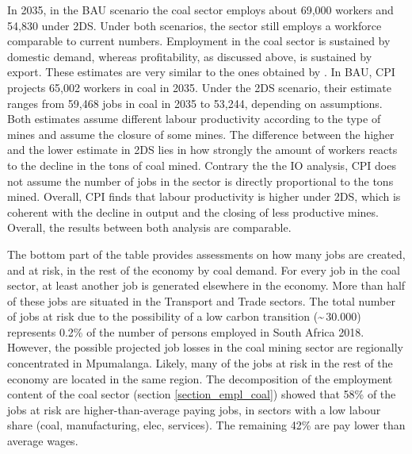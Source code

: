 \documentclass[12pt,english]{article}
\begin{document}
In 2035, in the BAU scenario the coal sector employs about 69,000 workers and 54,830 under 2DS. Under both scenarios, the sector still employs a workforce comparable to current numbers. Employment in the coal sector is sustained by domestic demand, whereas profitability, as discussed above, is sustained by export. These estimates are very similar to the ones obtained by \citep{CPI2019SA}. In BAU, CPI projects 65,002 workers in coal in 2035. Under the 2DS scenario, their estimate ranges from 59,468 jobs in coal in 2035 to 53,244, depending on assumptions. Both estimates assume different labour productivity according to the type of mines and assume the closure of some mines. The difference between the higher and the lower estimate in 2DS lies in how strongly the amount of workers reacts to the decline in the tons of coal mined. Contrary the the IO analysis, CPI does not assume the number of jobs in the sector is directly proportional to the tons mined. Overall, CPI finds that labour productivity is higher under 2DS, which is coherent with the decline in output and the closing of less productive mines. Overall, the results between both analysis are comparable. 

 
The bottom part of the table provides assessments on how many jobs are created, and at risk, in the rest of the economy by coal demand. For every job in the coal sector, at least another job is generated elsewhere in the economy. More than half of these jobs are situated in the Transport and Trade sectors. The total number of jobs at risk due to the possibility of a low carbon transition (\textasciitilde \,30.000) represents 0.2\% of the number of persons employed in South Africa 2018. However, the possible projected job losses in the coal mining sector are regionally concentrated in Mpumalanga. Likely, many of the jobs at risk in the rest of the economy are located in the same region.
The decomposition of the employment content of the coal sector (section \ref{section_empl_coal}) showed that 58\% of the jobs at risk are higher-than-average paying jobs, in sectors with a low labour share (coal, manufacturing, elec, services). The remaining 42\% are pay lower than average wages.
\end{document}
